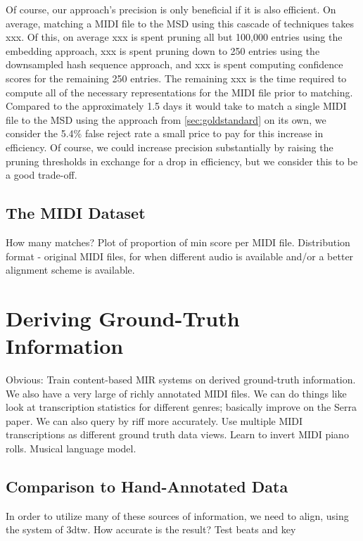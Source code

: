 Of course, our approach's precision is only beneficial if it is also efficient.
On average, matching a MIDI file to the MSD using this cascade of techniques takes xxx.
Of this, on average xxx is spent pruning all but 100,000 entries using the embedding approach, xxx is spent pruning down to 250 entries using the downsampled hash sequence approach, and xxx is spent computing confidence scores for the remaining 250 entries.
The remaining xxx is the time required to compute all of the necessary representations for the MIDI file prior to matching.
Compared to the approximately 1.5 days it would take to match a single MIDI file to the MSD using the approach from \cref{sec:goldstandard} on its own, we consider the 5.4\% false reject rate a small price to pay for this increase in efficiency.
Of course, we could increase precision substantially by raising the pruning thresholds in exchange for a drop in efficiency, but we consider this to be a good trade-off.

\subsection{The MIDI Dataset}

How many matches?  Plot of proportion of min score per MIDI file.
Distribution format - original MIDI files, for when different audio is available and/or a better alignment scheme is available.

\section{Deriving Ground-Truth Information}
\label{sec:deriving}

Obvious: Train content-based MIR systems on derived ground-truth information.
We also have a very large of richly annotated MIDI files.
We can do things like look at transcription statistics for different genres; basically improve on the Serra paper.
We can also query by riff more accurately.
Use multiple MIDI transcriptions as different ground truth data views.
Learn to invert MIDI piano rolls.
Musical language model.

\subsection{Comparison to Hand-Annotated Data}
\label{sec:reliability}

In order to utilize many of these sources of information, we need to align, using the system of 3dtw.
How accurate is the result?
Test beats and key

